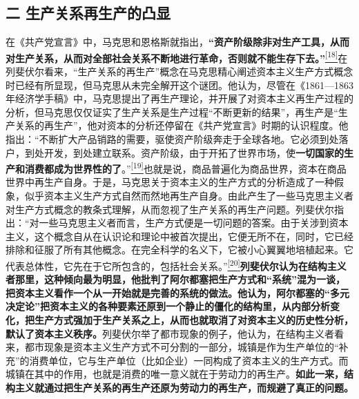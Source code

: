 \documentclass[UTF8, fontset = sourcesans, a4paper, oneside, zihao =
-4, scheme=chinese, no-math, space=true]{ctexbook}
\begin{document}
\subsection{二
生产关系再生产的凸显}\label{part0007_split_001.htmlux5cux23c026}

在《共产党宣言》中，马克思和恩格斯就指出，\textbf{``资产阶级除非对生产工具，从而对生产关系，从而对全部社会关系不断地进行革命，否则就不能生存下去。''}\protect\hypertarget{part0007_split_001.htmlux5cux23w18}{}{}\protect\hyperlink{part0007_split_004.htmlux5cux23m18}{\textsuperscript{{[}18{]}}}在列斐伏尔看来，``生产关系的再生产''概念在马克思精心阐述资本主义生产方式概念时已经有所显现，但马克思从未完全解开这个谜团。他认为，尽管在《1861---1863年经济学手稿》中，马克思提出了再生产理论，并开展了对资本主义再生产过程的分析，但马克思仅仅证实了生产关系是生产过程``不断更新的结果''，再生产是``生产关系的再生产''，他对资本的分析还停留在《共产党宣言》时期的认识程度。他指出：``不断扩大产品销路的需要，驱使资产阶级奔走于全球各地。它必须到处落户，到处开发，到处建立联系。资产阶级，由于开拓了世界市场，使\textbf{一切国家的生产和消费都成为世界性的了}。''\protect\hypertarget{part0007_split_001.htmlux5cux23w19}{}{}\protect\hyperlink{part0007_split_004.htmlux5cux23m19}{\textsuperscript{{[}19{]}}}也就是说，商品普遍化为商品世界，资本在商品世界中再生产自身。于是，马克思关于资本主义的生产方式的分析造成了一种假象，似乎资本主义生产方式自然而然地再生产自身。由此产生了一些马克思主义者对生产方式概念的教条式理解，从而忽视了生产关系的再生产问题。列斐伏尔指出：``对一些马克思主义者而言，生产方式便是一切问题的答案。由于关涉到资本主义，这个概念自从在认识论和理论中被首次提出，它便无所不在，同时，它已经排除和征服了所有其他概念。在完全科学的名义下，它被小心翼翼地培植起来。它代表总体性，它先在于它所包含的，包括社会关系。''\protect\hypertarget{part0007_split_001.htmlux5cux23w20}{}{}\protect\hyperlink{part0007_split_004.htmlux5cux23m20}{\textsuperscript{{[}20{]}}}\textbf{列斐伏尔认为在结构主义者那里，这种倾向最为明显，他批判了阿尔都塞把生产方式和``系统''混为一谈，把资本主义看作一个从一开始就是完善的系统的做法。他认为，阿尔都塞的``多元决定论''把资本主义的各种要素还原到一个静止的僵化的结构里，从内部分析变化，把生产方式强加于生产关系之上，从而也就取消了对资本主义的历史性分析，默认了资本主义秩序。}列斐伏尔举了都市现象的例子，他认为，在结构主义者看来，都市现象是资本主义生产方式不可分割的一部分，城镇是作为生产单位的``补充''的消费单位，它与生产单位（比如企业）一同构成了资本主义的生产方式。而城镇在其中的作用，也就是消费的唯一意义就在于劳动力的再生产。\textbf{如此一来，结构主义就通过把生产关系的再生产还原为劳动力的再生产，而规避了真正的问题。}
\end{document}
